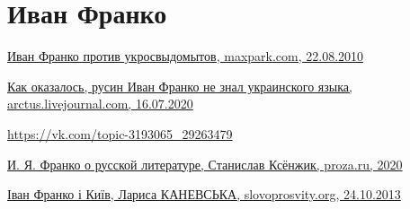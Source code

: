  
 
 
 
 
\section{Иван Франко}
\label{sec:people.franko_ivan_pisatel}

\href{https://maxpark.com/user/vosokov/content/579055}{%
Иван Франко против укросвыдомытов, maxpark.com, 22.08.2010%
%
}

\href{https://arctus.livejournal.com/1279292.html}{%
Как оказалось, русин Иван Франко не знал украинского языка, arctus.livejournal.com, 16.07.2020%
}

\url{https://vk.com/topic-3193065_29263479}

\href{https://proza.ru/2020/01/08/1411}{%
И. Я. Франко о русской литературе, Станислав Ксёнжик, proza.ru, 2020%
}

\href{http://slovoprosvity.org/2013/10/24/ivan-franko-i-kyiv/}{%
Іван Франко і Київ, Лариса КАНЕВСЬКА, slovoprosvity.org, 24.10.2013%
}
